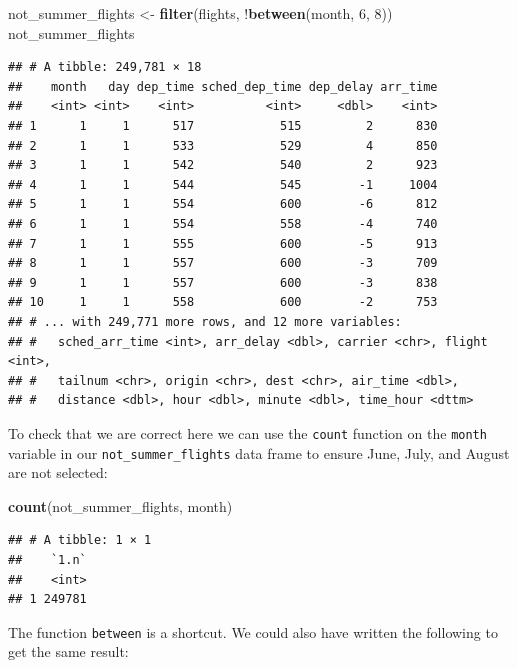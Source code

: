 \documentclass[]{tufte-book}
\newenvironment{Shaded}{\begin{snugshade}}{\end{snugshade}}
\newcommand{\KeywordTok}[1]{\textcolor[rgb]{0.13,0.29,0.53}{\textbf{{#1}}}}
\newcommand{\DecValTok}[1]{\textcolor[rgb]{0.00,0.00,0.81}{{#1}}}
\newcommand{\StringTok}[1]{\textcolor[rgb]{0.31,0.60,0.02}{{#1}}}
\newcommand{\NormalTok}[1]{{#1}}
\begin{document}
\begin{Shaded}
\begin{Highlighting}[]
\NormalTok{not_summer_flights <-}\StringTok{ }\KeywordTok{filter}\NormalTok{(flights,}
                             \NormalTok{!}\KeywordTok{between}\NormalTok{(month, }\DecValTok{6}\NormalTok{, }\DecValTok{8}\NormalTok{))}
\NormalTok{not_summer_flights}
\end{Highlighting}
\end{Shaded}

\begin{verbatim}
## # A tibble: 249,781 × 18
##    month   day dep_time sched_dep_time dep_delay arr_time
##    <int> <int>    <int>          <int>     <dbl>    <int>
## 1      1     1      517            515         2      830
## 2      1     1      533            529         4      850
## 3      1     1      542            540         2      923
## 4      1     1      544            545        -1     1004
## 5      1     1      554            600        -6      812
## 6      1     1      554            558        -4      740
## 7      1     1      555            600        -5      913
## 8      1     1      557            600        -3      709
## 9      1     1      557            600        -3      838
## 10     1     1      558            600        -2      753
## # ... with 249,771 more rows, and 12 more variables:
## #   sched_arr_time <int>, arr_delay <dbl>, carrier <chr>, flight <int>,
## #   tailnum <chr>, origin <chr>, dest <chr>, air_time <dbl>,
## #   distance <dbl>, hour <dbl>, minute <dbl>, time_hour <dttm>
\end{verbatim}

To check that we are correct here we can use the \texttt{count} function
on the \texttt{month} variable in our \texttt{not\_summer\_flights} data
frame to ensure June, July, and August are not selected:

\begin{Shaded}
\begin{Highlighting}[]
\KeywordTok{count}\NormalTok{(not_summer_flights, month)}
\end{Highlighting}
\end{Shaded}

\begin{verbatim}
## # A tibble: 1 × 1
##    `1.n`
##    <int>
## 1 249781
\end{verbatim}

The function \texttt{between} is a shortcut. We could also have written
the following to get the same result:
\end{document}
